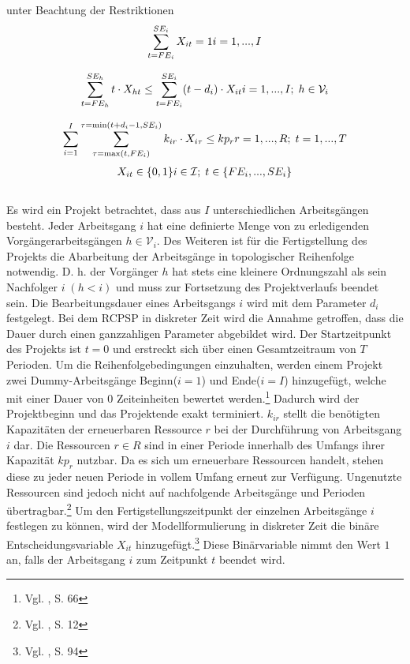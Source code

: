 \documentclass[a4paper,12pt,parskip,bibtotoc,liststotoc]{article}
\begin{document}
unter Beachtung der Restriktionen
\begin{multline} \label{N1}
\sum_{t=FE_{i}}^{SE_{i}} X_{it} = 1
\hfill   i = 1,...,I
\end{multline}\vspace{-3.0ex}

\begin{multline} \label{N2}
\sum_{t=FE_{h}}^{SE_{h}}t \cdot X_{ht} \leq \sum_{t=FE_{i}}^{SE_{i}}(t - d_{i}) \cdot X_{it}
\hfill   i =1,...,I;\; h \in \mathcal{V}_{i}
\end{multline}\vspace{-3.0ex}

\begin{multline} \label{N3}
\sum_{i=1}^{I}\sum_{\tau=\max(t,FE_{i})}^{\tau=\min(t+d_i-1,SE_i)}k_ {ir} \cdot X_{i\tau} \leq kp_{r}
\hfill   r =1,...,R;\; t=1,...,T
\end{multline}\vspace{-3.0ex}
\begin{multline} \label{N4}
X_{it} \in \{0,1\}
\hfill   i \in \mathcal{I};\; t \in \{FE_{i},...,SE_{i}\}\end{multline}\vspace{-6.0ex}\\

Es wird ein Projekt betrachtet, dass aus $I$ unterschiedlichen Arbeitsgängen besteht. Jeder Arbeitsgang $i$ hat eine definierte Menge von zu erledigenden Vorgängerarbeitsgängen $h \in \mathcal{V}_{i}$. Des Weiteren ist für die Fertigstellung des Projekts die Abarbeitung der Arbeitsgänge in topologischer Reihenfolge notwendig. D. h. der Vorgänger $h$ hat stets eine kleinere Ordnungszahl als sein Nachfolger $i\;(h<i)$ und muss zur Fortsetzung des Projektverlaufs beendet sein. Die Bearbeitungsdauer eines Arbeitsgangs $i$ wird mit dem Parameter $d_{i}$ festgelegt.  Bei dem RCPSP in diskreter Zeit wird die Annahme getroffen, dass die Dauer durch einen ganzzahligen Parameter abgebildet wird. Der Startzeitpunkt des Projekts ist $t = 0$ und erstreckt sich über einen Gesamtzeitraum von $T$ Perioden. Um die Reihenfolgebedingungen einzuhalten, werden einem Projekt zwei Dummy-Arbeitsgänge \glqq Beginn\grqq\;($i=1$) und \glqq Ende\grqq\;($i=I$) hinzugefügt, welche mit einer Dauer von $0$ Zeiteinheiten bewertet werden.\footnote{Vgl. \cite{zimmermann2006projektplanung}, S. 66} Dadurch wird der Projektbeginn und das Projektende exakt terminiert. $k_{ir}$ stellt die benötigten Kapazitäten der erneuerbaren Ressource $r$ bei der Durchführung von Arbeitsgang $i$ dar. Die Ressourcen $r \in R$ sind in einer Periode innerhalb des Umfangs ihrer Kapazität $kp_{r}$ nutzbar. Da es sich um erneuerbare Ressourcen handelt, stehen diese zu jeder neuen Periode in vollem Umfang erneut zur Verfügung. Ungenutzte Ressourcen sind jedoch nicht auf nachfolgende Arbeitsgänge und Perioden übertragbar.\footnote{Vgl. \cite{kellenbrink2014einfuhrung}, S. 12} Um den Fertigstellungszeitpunkt der einzelnen Arbeitsgänge $i$ festlegen zu können, wird der Modellformulierung in diskreter Zeit die binäre Entscheidungsvariable $X_{it}$ hinzugefügt.\footnote{Vgl. \cite{pritsker1969multiproject}, S. 94} Diese Binärvariable nimmt den Wert $1$ an, falls der Arbeitsgang $i$ zum Zeitpunkt $t$ beendet wird.\\
\end{document}
